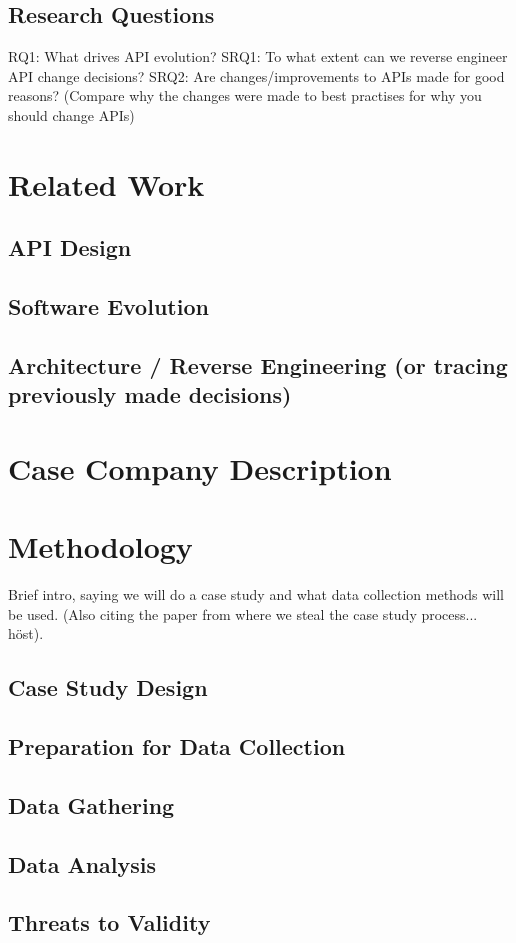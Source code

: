 \documentclass[10pt,twocolumn]{article}
\begin{document}
\subsection{Research Questions}
RQ1: What drives API evolution? 
SRQ1: To what extent can we reverse engineer API change decisions?
SRQ2: Are changes/improvements to APIs made for good reasons? (Compare why the changes were made to best practises for why you should change APIs)

\section{Related Work}

\subsection{API Design}

\subsection{Software Evolution}

\subsection{Architecture / Reverse Engineering (or tracing previously made decisions)}

\section{Case Company Description}



\section{Methodology}
Brief intro, saying we will do a case study and what data collection methods will be used. (Also citing the paper from where we steal the case study process... höst).

\subsection{Case Study Design}


\subsection{Preparation for Data Collection}

\subsection{Data Gathering}

\subsection{Data Analysis}

\subsection{Threats to Validity}








\noindent
\end{document}
